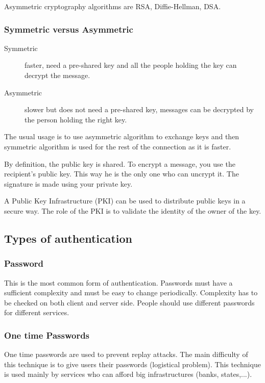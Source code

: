 Asymmetric cryptography algorithms are RSA, Diffie-Hellman, DSA.

\subsubsection{Symmetric versus Asymmetric}

\begin{description}
\item[Symmetric]
faster, need a pre-shared key and all the people holding the key can
decrypt the message.
\item[Asymmetric]
slower but does not need a pre-shared key, messages can be decrypted by the
person holding the right key.
\end{description}

The usual usage is to use asymmetric algorithm to exchange keys and then
symmetric algorithm is used for the rest of the connection as it is faster.

By definition, the public key is shared.
To encrypt a message, you use the recipient's public key. This way he is the
only one who can uncrypt it. The signature is made using your private key.

A Public Key Infrastructure (PKI) can be used to distribute public keys in a
secure way. The role of the PKI is to validate the identity of the owner of
the key.

\subsection{Types of authentication}

\subsubsection{Password}
This is the most common form of authentication.
Passwords must have a sufficient complexity and must be easy to change
periodically.
Complexity has to be checked on both client and server side.
People should use different passwords for different services.

\subsubsection{One time Passwords}
One time passwords are used to prevent replay attacks.
The main difficulty of this technique is to give users their passwords
(logistical problem).
This technique is used mainly by services who can afford big infrastructures
(banks, states,...).

